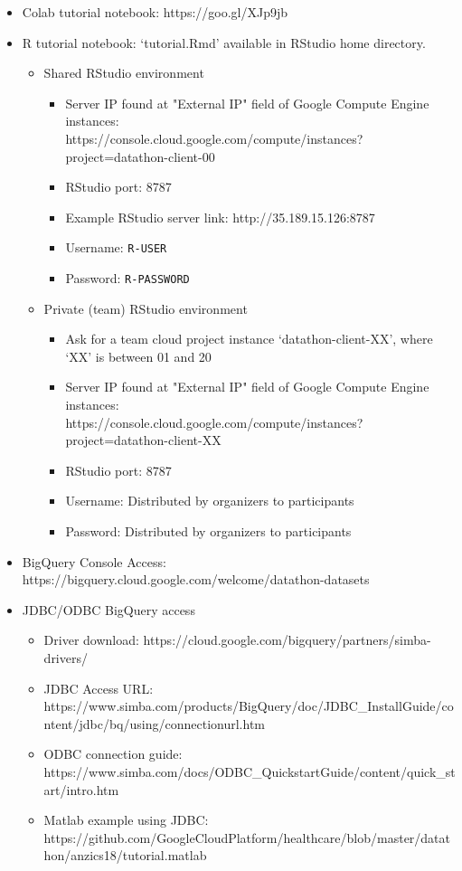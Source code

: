 \begin{itemize}
\item Colab tutorial notebook: https://goo.gl/XJp9jb
\item  R tutorial notebook: `tutorial.Rmd' available in RStudio home directory.
  \begin{itemize}
  \item Shared RStudio environment
    \begin{itemize}
        \item Server IP found at "External IP" field of Google Compute Engine instances:\\
          https://console.cloud.google.com/compute/instances?project=datathon-client-00
        \item RStudio port: 8787
        \item Example RStudio server link: http://35.189.15.126:8787
        \item Username: \texttt{R-USER}
        \item Password: \texttt{R-PASSWORD}
    \end{itemize}
  \item Private (team) RStudio environment
    \begin{itemize}
      \item Ask for a team cloud project instance `datathon-client-XX', where `XX' is between 01 and 20
      \item Server IP found at "External IP" field of Google Compute Engine instances:\\
        https://console.cloud.google.com/compute/instances?project=datathon-client-XX
      \item RStudio port: 8787
      \item Username: Distributed by organizers to participants
      \item Password: Distributed by organizers to participants
    \end{itemize}
  \end{itemize}
\item BigQuery Console Access: https://bigquery.cloud.google.com/welcome/datathon-datasets
\item JDBC/ODBC BigQuery access
  \begin{itemize}
    \item Driver download: https://cloud.google.com/bigquery/partners/simba-drivers/
    \item JDBC Access URL:\\
      https://www.simba.com/products/BigQuery/doc/JDBC\_InstallGuide/content/jdbc/bq/using/connectionurl.htm
    \item ODBC connection guide: https://www.simba.com/docs/ODBC\_QuickstartGuide/content/quick\_start/intro.htm
    \item Matlab example using JDBC:\\
      https://github.com/GoogleCloudPlatform/healthcare/blob/master/datathon/anzics18/tutorial.matlab
  \end{itemize}
\end{itemize}

\newpage

